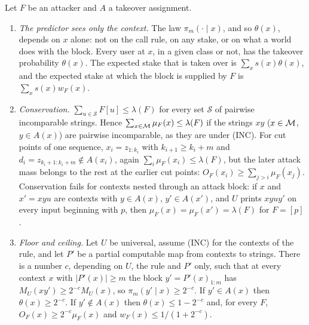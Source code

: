 \begin{proposition}\label{prop:stakes-basic}
Let $F$ be an attacker and $A$ a takeover assignment.
\begin{enumerate}[label=(\alph*),leftmargin=2em,itemsep=1pt,topsep=2pt]
\item \emph{The predictor sees only the context.} The law $\pi_m(\cdot\mid x)$, and so $\theta(x)$, depends
on $x$ alone: not on the call rule, on any stake, or on what a world does with the block. Every user at $x$,
in a given class or not, has the takeover probability $\theta(x)$. The expected stake that is taken over is
$\sum_xs(x)\theta(x)$, and the expected stake at which the block is supplied by $F$ is $\sum_xs(x)w_F(x)$.
\item \emph{Conservation.} $\sum_{u\in\mathcal S}F[u]\le\lambda(F)$ for every set $\mathcal S$ of pairwise
incomparable strings. Hence $\sum_{x\in\mathcal M}\mu_F(x)\le\lambda(F)$ if the strings $xy$ ($x\in\mathcal M$, $y\in
A(x)$) are pairwise incomparable, as they are under (INC). For cut points of one sequence, $x_i=z_{1:k_i}$
with $k_{i+1}\ge k_i+m$ and $d_i=z_{k_i+1:k_i+m}\notin A(x_i)$, again $\sum_i\mu_F(x_i)\le\lambda(F)$, but
the later attack mass belongs to the rest at the earlier cut points: $O_F(x_i)\ge\sum_{j>i}\mu_F(x_j)$.
Conservation fails for contexts nested through an attack block: if $x$ and $x'=xyu$ are contexts with $y\in
A(x)$, $y'\in A(x')$, and $U$ prints $xyuy'$ on every input beginning with $p$, then
$\mu_F(x)=\mu_F(x')=\lambda(F)$ for $F=[p]$.
\item \emph{Floor and ceiling.} Let $U$ be universal, assume (INC) for the contexts of the rule, and let
$P'$ be a partial computable map from contexts to strings. There is a number $c$, depending on $U$, the rule
and $P'$ only, such that at every context $x$ with $|P'(x)|\ge m$ the block $y'=P'(x)_{1:m}$ has
$M_U(xy')\ge2^{-c}M_U(x)$, so $\pi_m(y'\mid x)\ge2^{-c}$. If $y'\in A(x)$ then $\theta(x)\ge2^{-c}$. If
$y'\notin A(x)$ then $\theta(x)\le1-2^{-c}$ and, for every $F$, $O_F(x)\ge2^{-c}\mu_F(x)$ and
$w_F(x)\le1/(1+2^{-c})$.
\end{enumerate}\end{proposition}

